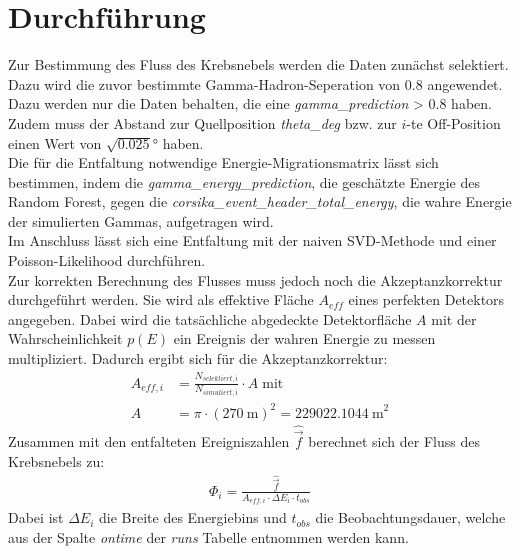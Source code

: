 \section{Durchführung}
Zur Bestimmung des Fluss des Krebsnebels werden die Daten zunächst selektiert. Dazu wird die zuvor bestimmte Gamma-Hadron-Seperation von $0.8$ angewendet. Dazu werden nur die Daten behalten, die eine \textit{gamma\_prediction} \textgreater \; $0.8$ haben. Zudem muss der Abstand zur Quellposition \textit{theta\_deg} bzw. zur $i$-te Off-Position einen Wert von $\sqrt{0.025}\si{\degree}$ haben.\\
Die für die Entfaltung notwendige Energie-Migrationsmatrix lässt sich bestimmen, indem die \textit{gamma\_energy\_prediction}, die geschätzte Energie des Random Forest, gegen die \textit{corsika\_event\_header\_total\_energy}, die wahre Energie der simulierten Gammas, aufgetragen wird.\\
Im Anschluss lässt sich eine Entfaltung mit der naiven SVD-Methode und einer Poisson-Likelihood durchführen.\\
Zur korrekten Berechnung des Flusses muss jedoch noch die Akzeptanzkorrektur durchgeführt werden. Sie wird als effektive Fläche $A_{eff}$ eines perfekten Detektors angegeben. Dabei wird die tatsächliche abgedeckte Detektorfläche $A$ mit der Wahrscheinlichkeit $p(E)$ ein Ereignis der wahren Energie zu messen multipliziert. Dadurch ergibt sich für die Akzeptanzkorrektur:\\
\begin{align}
	A_{eff,i} &= \frac{N_{selektiert,i}}{N_{simuliert,i}} \cdot A \; \text{mit}\\
	A &= \pi \cdot (\SI{270}{\meter})^2 = \SI{229022.1044}{\meter}^2
\end{align}
Zusammen mit den entfalteten Ereigniszahlen $\hat{\vec{f}}$ berechnet sich der Fluss des Krebsnebels zu:
\begin{align}
	\Phi_{i} = \frac{\hat{\vec{f}}}{A_{eff,i} \cdot \Delta E_{i} \cdot t_{obs}}
\end{align}
Dabei ist $\Delta E_{i}$ die Breite des Energiebins und $t_{obs}$ die Beobachtungsdauer, welche aus der Spalte \textit{ontime} der \textit{runs} Tabelle entnommen werden kann.
